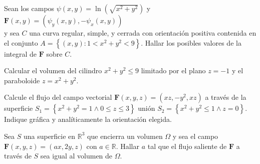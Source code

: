 
\begin{question}
    Sean los campos $\psi (x,y) = \ln(\sqrt{x^2+y^2})$ y $\mathbf{F}(x,y)= \left(\psi_y(x,y), -\psi_x(x,y)\right)$
    \\y sea $C$ una curva regular, simple, y cerrada con orientación positiva contenida en el conjunto
    $A=\left\{(x,y): 1 < x^2+y^2 < 9 \right\}$. Hallar los posibles valores de la integral de $\mathbf{F}$ sobre $C$.
\end{question}


\begin{question}
    Calcular el volumen del cilindro $x^2+y^2 \leq 9$ limitado por el plano $z=-1$ y el
    paraboloide $z=x^2+y^2$.
\end{question}


\begin{question}
    Calcule el flujo del campo vectorial $\mathbf{F}(x,y,z)= (xz,-y^2,xz)$ a través de la superficie
    $S_1=\left\{x^2+y^2=1 \land 0\leq z \leq 3\right\}$ unión $S_2=\left\{x^2+y^2\leq 1 \land z=0\right\}$.
    Indique gráfica y analíticamente la orientación elegida.
\end{question}



\begin{question}
    Sea $S$ una superficie en $\mathbb{R}^3$ que encierra un volumen $\Omega$ y sea el campo
    $\mathbf{F}(x,y,z)=(ax,2y,z)$ con $a \in \mathbb{R}$. Hallar $a$ tal que el flujo saliente de $\mathbf{F}$ a través de $S$
    sea igual al volumen de $\Omega$.
\end{question}

